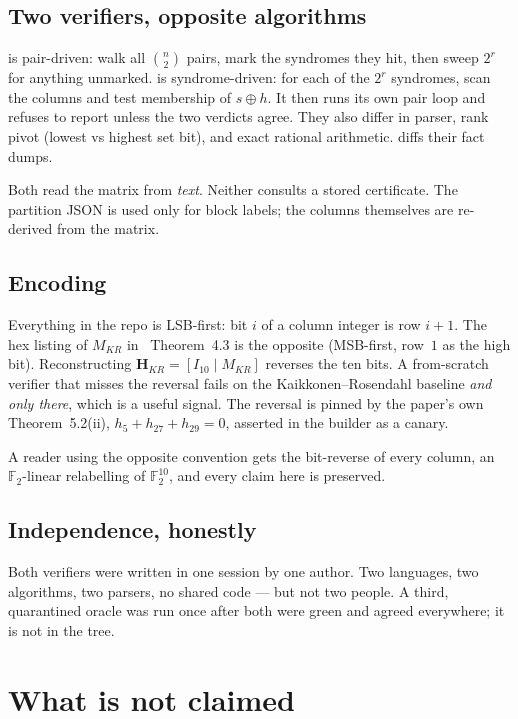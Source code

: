 \documentclass[11pt,a4paper]{article}
\newcommand{\FF}{\mathbb{F}}
\newcommand{\HH}{\boldsymbol{H}}
\begin{document}
\subsection{Two verifiers, opposite algorithms}

 is pair-driven: walk all $\binom{n}{2}$ pairs,
mark the syndromes they hit, then sweep $2^r$ for anything unmarked.
 is syndrome-driven: for each of the $2^r$
syndromes, scan the columns and test membership of $s\oplus h$. It then
runs its own pair loop and refuses to report unless the two verdicts
agree. They also differ in parser, rank pivot (lowest vs highest set
bit), and exact rational arithmetic.  diffs their
fact dumps.

Both read the matrix from \emph{text}. Neither consults a stored
certificate. The partition JSON is used only for block labels; the
columns themselves are re-derived from the matrix.

\subsection{Encoding}

Everything in the repo is LSB-first: bit $i$ of a column integer is
row $i+1$. The hex listing of $M_{KR}$ in~\cite{DMP2025} Theorem~4.3 is
the opposite (MSB-first, row~$1$ as the high bit). Reconstructing
$\HH_{KR}=[I_{10}\mid M_{KR}]$ reverses the ten bits. A from-scratch
verifier that misses the reversal fails on the Kaikkonen--Rosendahl
baseline \emph{and only there}, which is a useful signal. The reversal
is pinned by the paper's own Theorem~5.2(ii),
$h_5+h_{27}+h_{29}=0$, asserted in the builder as a canary.

A reader using the opposite convention gets the bit-reverse of every
column, an $\FF_2$-linear relabelling of $\FF_2^{10}$, and every claim
here is preserved.

\subsection{Independence, honestly}

Both verifiers were written in one session by one author. Two languages,
two algorithms, two parsers, no shared code --- but not two people. A
third, quarantined oracle was run once after both were green and agreed
everywhere; it is not in the tree.

\section{What is not claimed}
\end{document}
